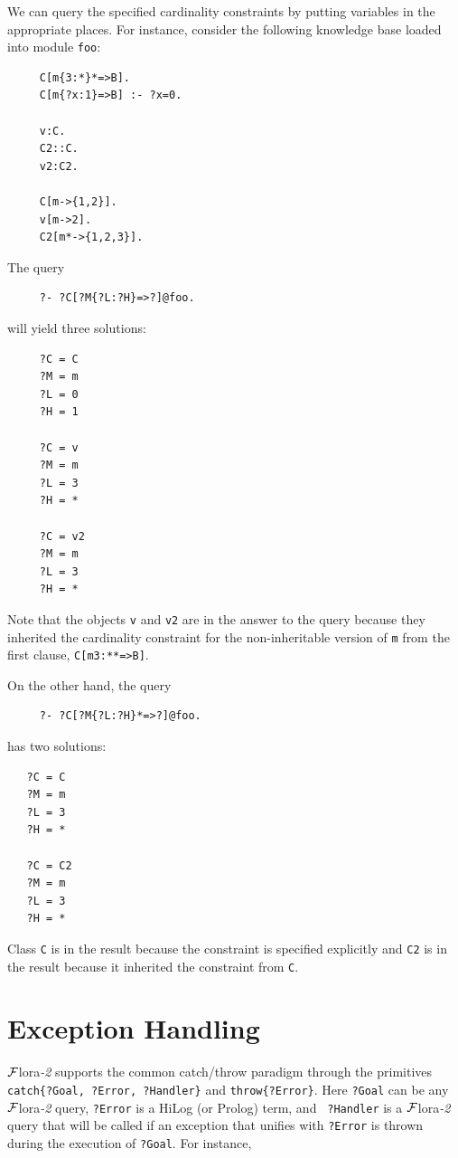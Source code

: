 \documentclass[11pt]{article}
\newcommand{\FLORA}{{\mbox{\sc ${\cal F}${lora}\rm\emph{-2}}}\xspace}
\begin{document}
We can query the specified cardinality constraints by putting variables in
the appropriate places. For instance, consider the following knowledge base
loaded into module {\tt foo}: 
\begin{verbatim}
     C[m{3:*}*=>B].
     C[m{?x:1}=>B] :- ?x=0.

     v:C.
     C2::C.
     v2:C2.
   
     C[m->{1,2}].
     v[m->2].
     C2[m*->{1,2,3}].
\end{verbatim}
The query
\begin{verbatim}
     ?- ?C[?M{?L:?H}=>?]@foo. 
\end{verbatim}
will yield three solutions:
\begin{verbatim}
     ?C = C 
     ?M = m
     ?L = 0
     ?H = 1

     ?C = v
     ?M = m
     ?L = 3
     ?H = *

     ?C = v2
     ?M = m
     ?L = 3
     ?H = *
\end{verbatim}
Note that the objects {\tt v} and {\tt v2} are in the answer to the query
because they inherited the cardinality constraint for the non-inheritable
version of {\tt m} from the first clause, {\tt C[m{3:*}*=>B]}.

On the other hand, the query
\begin{verbatim}
     ?- ?C[?M{?L:?H}*=>?]@foo.
\end{verbatim}
has two solutions:
\begin{verbatim}
   ?C = C 
   ?M = m
   ?L = 3
   ?H = *
   
   ?C = C2
   ?M = m
   ?L = 3
   ?H = *
\end{verbatim}
Class {\tt C} is in the result because the constraint is specified
explicitly and {\tt C2} is in the result because it inherited the
constraint from {\tt C}.   


\section{Exception Handling}\label{sec-errors}

\FLORA supports the common catch/throw paradigm through the primitives {\tt
  catch\{?Goal, ?Error, ?Handler\}} and {\tt throw\{?Error\}}.  Here {\tt ?Goal}
can be any \FLORA query, {\tt ?Error} is a HiLog (or Prolog) term, and {\tt
  ?Handler} is a \FLORA query that will be called if an exception that
unifies with {\tt ?Error} is thrown during the execution of {\tt ?Goal}. For
instance,
\end{document}
